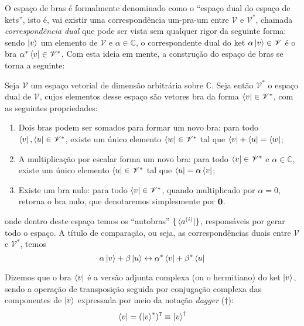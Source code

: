 O espaço de bras é formalmente denominado como o “espaço dual do espaço de kets”, isto é, vai existir uma correspondência um-pra-um entre $\mathscr{V}$ e $\mathscr{V}^{\ast}$, chamada \textit{correspondência dual} que pode ser vista sem qualquer rigor da seguinte forma: sendo $\ket{v}$ um elemento de $\mathscr{V}$ e $\alpha\in\mathbb{C}$, o correspondente dual do ket $\alpha\ket{v}\in\mathscr{V}$ é o bra $\alpha^{\ast}\bra{v}\in\mathscr{V}^{\ast}$. Com esta ideia em mente, a construção do espaço de bras se torna a seguinte:
\begin{definition}
    \label{def: bra space}
    Seja $\mathscr{V}$ um espaço vetorial de dimensão arbitrária sobre $\mathbb{C}$. Seja então $\mathscr{V}^{\ast}$ o espaço dual de $\mathscr{V}$, cujos elementos desse espaço são vetores bra da forma $\bra{v}\in\mathscr{V}^{\ast}$, com as seguintes propriedades:
    \begin{enumerate}
        \item Dois bras podem ser somados para formar um novo bra: para todo $\bra{v},\bra{u}\in\mathscr{V}^{\ast}$, existe um único elemento $\bra{w}\in\mathscr{V}^{\ast}$ tal que $\bra{v} + \bra{u} = \bra{w}$;
        \item A multiplicação por escalar forma um novo bra: para todo $\bra{v}\in\mathscr{V}^{\ast}$ e $\alpha\in\mathbb{C}$, existe um único elemento $\bra{u}\in\mathscr{V}^{\ast}$ tal que $\bra{u} = \alpha\bra{v}$;
        \item Existe um bra nulo: para todo $\bra{v}\in\mathscr{V}^{\ast}$, quando multiplicado por $\alpha = 0$, retorna o bra nulo, que denotaremos simplesmente por $\vb{0}$.
    \end{enumerate}
\end{definition}
onde dentro deste espaço temos os “autobras” $\{\bra*{a^{(i)}}\}$, responsáveis por gerar todo o espaço. A título de comparação, ou seja, as correspondências duais entre $\mathscr{V}$ e $\mathscr{V}^{\ast}$, temos
    \begin{equation}\label{eq: dual correspondence brackets}
        \alpha\ket{v} + \beta\ket{u} \leftrightarrow \alpha^{\ast}\bra{v} + \beta^{\ast}\bra{u}
    \end{equation}

Dizemos que o bra $\bra{v}$ é a versão adjunta complexa (ou o hermitiano) do ket $\ket{v}$, sendo a operação de transposição seguida por conjugação complexa das componentes de $\ket{v}$ expressada por meio da notação \textit{dagger} ($\dagger$):
\begin{equation*}
    \bra{v} = (\ket{v}^*)^\mathtt{T} \equiv \ket{v}^\dagger
\end{equation*}

